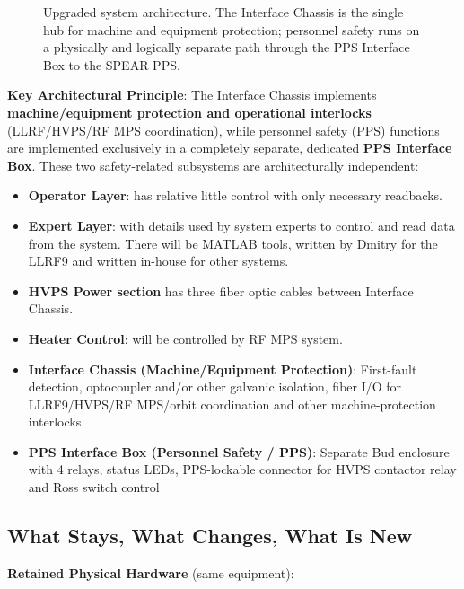 {\begin{figure}[p]
\centering
\begin{fitpicture}\end{fitpicture}
\caption{Upgraded system architecture.  The Interface Chassis is the single hub for machine and equipment protection; personnel safety runs on a physically and logically separate path through the PPS Interface Box to the SPEAR PPS.}\label{fig:upgrade-architecture}
\end{figure}
\textbf{Key Architectural Principle}: The Interface Chassis implements \textbf{machine/equipment protection and operational interlocks} (LLRF/HVPS/RF MPS coordination), while personnel safety (PPS) functions are implemented exclusively in a completely separate, dedicated \textbf{PPS Interface Box}. These two safety-related subsystems are architecturally independent:

\begin{itemize}
\tightlist
\item
  \textbf{Operator Layer}: has relative little control with only necessary readbacks.
\item
  \textbf{Expert Layer}: with details used by system experts to control and read data from the system. There will be MATLAB tools, written by Dmitry for the LLRF9 and written in-house for other systems.
\item
  \textbf{HVPS Power section} has three fiber optic cables between Interface Chassis.
\item
  \textbf{Heater Control}: will be controlled by RF MPS system.
\item
  \textbf{Interface Chassis (Machine/Equipment Protection)}: First-fault detection, optocoupler and/or other galvanic isolation, fiber I/O for LLRF9/HVPS/RF MPS/orbit coordination and other machine-protection interlocks
\item
  \textbf{PPS Interface Box (Personnel Safety / PPS)}: Separate Bud enclosure with 4 relays, status LEDs, PPS-lockable connector for HVPS contactor relay and Ross switch control
\end{itemize}

\subsection{What Stays, What Changes, What Is New}\label{what-stays-what-changes-what-is-new}

\noindent\textbf{Retained Physical Hardware} (same equipment):

}
